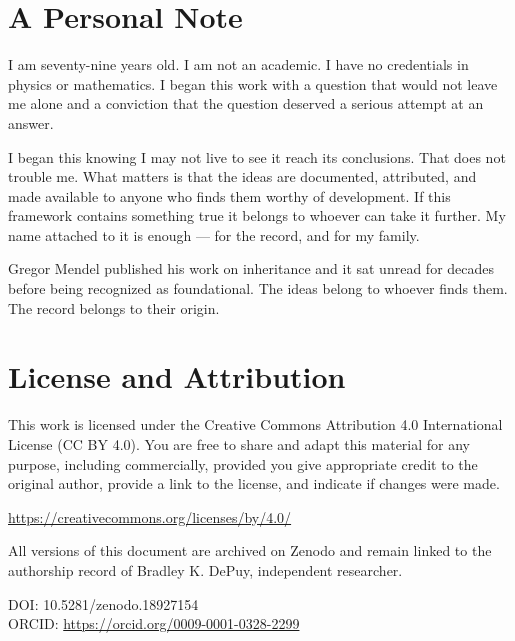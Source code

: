 \documentclass[11pt,letterpaper]{article}
\begin{document}
\section{A Personal Note}
\label{sec:orgdd6e58e}

I am seventy-nine years old. I am not an academic. I have no credentials in physics or mathematics. I began this work with a question that would not leave me alone and a conviction that the question deserved a serious attempt at an answer.

I began this knowing I may not live to see it reach its conclusions. That does not trouble me. What matters is that the ideas are documented, attributed, and made available to anyone who finds them worthy of development. If this framework contains something true it belongs to whoever can take it further. My name attached to it is enough --- for the record, and for my family.

Gregor Mendel published his work on inheritance and it sat unread for decades before being recognized as foundational. The ideas belong to whoever finds them. The record belongs to their origin.


\section{License and Attribution}
\label{sec:org1c56c2a}

This work is licensed under the Creative Commons Attribution 4.0 International License (CC BY 4.0). You are free to share and adapt this material for any purpose, including commercially, provided you give appropriate credit to the original author, provide a link to the license, and indicate if changes were made.

\url{https://creativecommons.org/licenses/by/4.0/}

All versions of this document are archived on Zenodo and remain linked to the authorship record of Bradley K. DePuy, independent researcher.

DOI: 10.5281/zenodo.18927154\\[0pt]
ORCID: \url{https://orcid.org/0009-0001-0328-2299}
\end{document}
